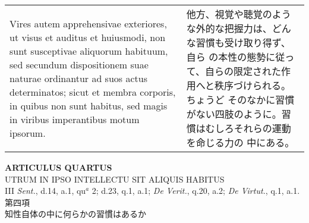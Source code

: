\documentclass[10pt]{jsarticle} %
\begin{document}
\begin{longtable}{p{21em}p{21em}}
\\

Vires autem apprehensivae exteriores, ut visus et auditus et
huiusmodi, non sunt susceptivae aliquorum habituum, sed secundum
dispositionem suae naturae ordinantur ad suos actus determinatos;
sicut et membra corporis, in quibus non sunt habitus, sed magis in
viribus imperantibus motum ipsorum.

&

他方、視覚や聴覚のような外的な把握力は、どんな習慣も受け取り得ず、自ら
の本性の態勢に従って、自らの限定された作用へと秩序づけられる。ちょうど
そのなかに習慣がない四肢のように。習慣はむしろそれらの運動を命じる力の
中にある。


\end{longtable}
\newpage


\begin{center}
{\Large {\bf ARTICULUS QUARTUS}}\\
{\large UTRUM IN IPSO INTELLECTU SIT ALIQUIS HABITUS}\\
{\footnotesize III {\itshape Sent.}, d.14, a.1, qu$^{a}$ 2; d.23, q.1,
 a.1; {\itshape De Verit.}, q.20, a.2; {\itshape De Virtut.}, q.1, a.1.}\\
{\Large 第四項\\知性自体の中に何らかの習慣はあるか}
\end{center}
\end{document}
